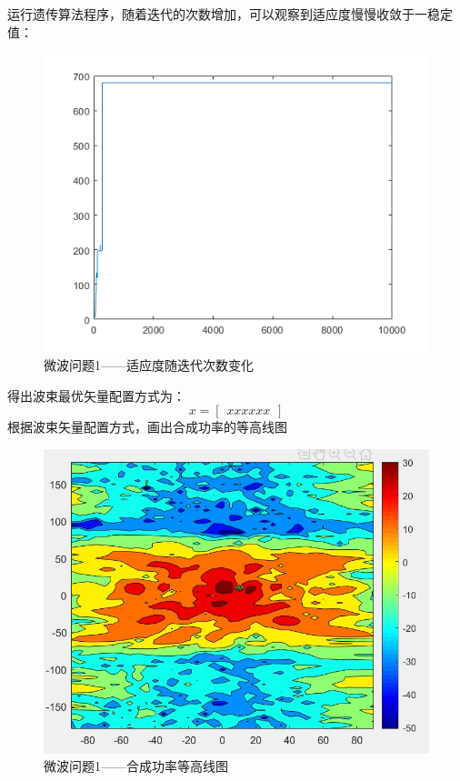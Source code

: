 \documentclass[UTF8,12pt]{ctexart}
\begin{document}
        运行遗传算法程序，随着迭代的次数增加，可以观察到适应度慢慢收敛于一稳定值：
        \begin{figure}[H]
            \centering
            \includegraphics[scale=0.8]{lian1.png}
            \caption{微波问题1——适应度随迭代次数变化}
            \end{figure}
        得出波束最优矢量配置方式为：
        $$x = \begin{bmatrix}xxxxxx\end{bmatrix}$$ 
        根据波束矢量配置方式，画出合成功率的等高线图
        \begin{figure}[H]
          \centering
          \includegraphics[scale=0.6]{h1.jpg}
          \caption{微波问题1——合成功率等高线图}
          \end{figure} 
\end{document}
